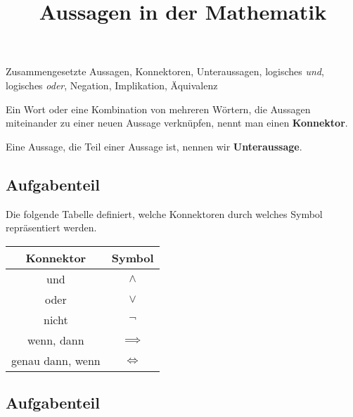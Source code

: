 \documentclass{uebungsblatt}
\title{Aussagen in der Mathematik}
\begin{document}
\maketitle
\begin{contents}
    Zusammengesetzte Aussagen, Konnektoren, Unteraussagen, logisches \emph{und}, logisches \emph{oder}, Negation, Implikation, Äquivalenz
\end{contents}


\begin{definition}
    Ein Wort oder eine Kombination von mehreren Wörtern, die Aussagen miteinander zu einer neuen Aussage verknüpfen, nennt man einen \textbf{Konnektor}.
\end{definition}

\begin{definition}
    Eine Aussage, die Teil einer Aussage ist, nennen wir \textbf{Unteraussage}.
\end{definition}

\subsection*{Aufgabenteil}

\newpage


\begin{definition}
    Die folgende Tabelle definiert, welche Konnektoren durch welches Symbol repräsentiert werden.
    \begin{center}
        \begin{tabular}{cc}\toprule
                        Konnektor & Symbol\\\midrule
                    und &  $\land$\\
                        oder&  $\lor$ \\
                        nicht & $\lnot$ \\
                        wenn, dann& $\implies$\\
                        genau dann, wenn&  $\iff$ \\
                        \bottomrule
        \end{tabular}
    \end{center}
\end{definition}

\subsection*{Aufgabenteil}

\end{document}
